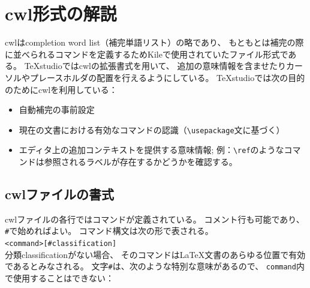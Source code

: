\section{cwl形式の解説}\label{sec:desc_of_clw}

cwlはcompletion word list（補完単語リスト）の略であり、
もともとは補完の際に並べられるコマンドを定義するためKileで使用されていたファイル形式である。
TeXstudioではcwlの拡張書式を用いて、
追加の意味情報を含ませたりカーソルやプレースホルダの配置を行えるようにしている。
TeXstudioでは次の目的のためにcwlを利用している：

\begin{itemize}
\item
  自動補完の事前設定
\item
  現在の文書における有効なコマンドの認識（\verb+\usepackage+文に基づく）
\item
  エディタ上の追加コンテキストを提供する意味情報;
  例：\verb+\ref+のようなコマンドは参照されるラベルが存在するかどうかを確認する。
\end{itemize}

\subsection{cwlファイルの書式}

cwlファイルの各行ではコマンドが定義されている。
コメント行も可能であり、\verb+#+で始めればよい。
コマンド構文は次の形で表される。\\

\verb+<command>[#classification]+\\

分類classificationがない場合、
そのコマンドはLaTeX文書のあらゆる位置で有効であるとみなされる。
文字\verb+#+は、次のような特別な意味があるので、
\verb+command+内で使用することはできない：

